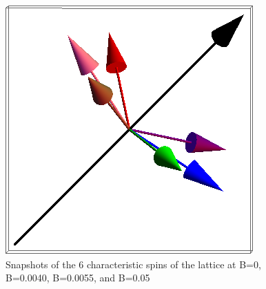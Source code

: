 \documentclass{article}
\begin{document}
\begin{figure}[ht]
\includegraphics[scale=0.27]{501S000to005G.png}
\caption{Snapshots of the 6 characteristic spins of the lattice at B=0, B=0.0040, B=0.0055, and B=0.05}
\end{figure}
\pagebreak
\end{document}
